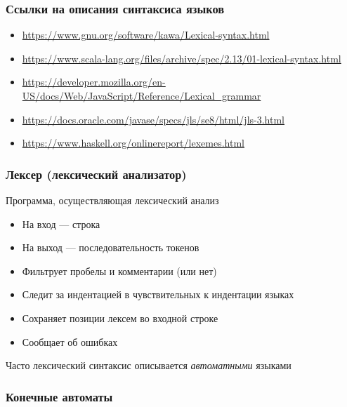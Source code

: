 \documentclass{beamer}
\begin{document}
\begin{frame}[fragile]
  \transwipe[direction=90]
  \frametitle{Ссылки на описания синтаксиса языков}
  \begin{itemize}
    \item \url{https://www.gnu.org/software/kawa/Lexical-syntax.html}
    \item \url{https://www.scala-lang.org/files/archive/spec/2.13/01-lexical-syntax.html}
    \item \url{https://developer.mozilla.org/en-US/docs/Web/JavaScript/Reference/Lexical_grammar}
    \item \url{https://docs.oracle.com/javase/specs/jls/se8/html/jls-3.html}
    \item \url{https://www.haskell.org/onlinereport/lexemes.html}
  \end{itemize}

\end{frame}


\begin{frame}[fragile]
  \transwipe[direction=90]
  \frametitle{Лексер (лексический анализатор)}
\begin{center}
  Программа, осуществляющая лексический анализ
\end{center}

\begin{itemize}
  \item На вход --- строка
  \item На выход --- последовательность токенов
\end{itemize}

\begin{itemize}
  \item Фильтрует пробелы и комментарии (или нет)
  \item Следит за индентацией в чувствительных к индентации языках
  \item Сохраняет позиции лексем во входной строке
  \item Сообщает об ошибках
\end{itemize}

\begin{center}
  Часто лексический синтаксис описывается \emph{автоматными} языками
\end{center}
\end{frame}

\begin{frame}[fragile]
  \transwipe[direction=90]
  \frametitle{Конечные автоматы}
  \begin{center}
  \end{center}
\end{frame}
\end{document}
